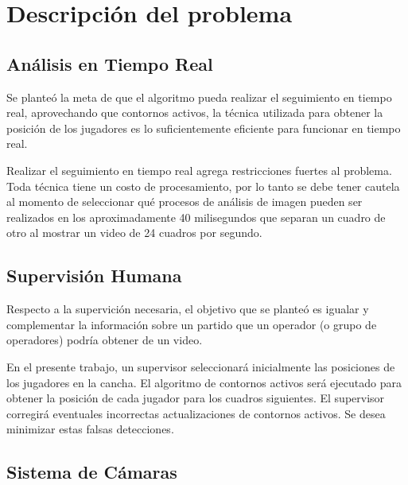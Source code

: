 \chapter{Descripción del problema}
\label{chap-problems}



\section{Análisis en Tiempo Real}

Se planteó la meta de que el algoritmo pueda realizar el seguimiento en tiempo
real, aprovechando que contornos activos, la técnica utilizada para obtener la
posición de los jugadores es lo suficientemente eficiente para funcionar en
tiempo real.

Realizar el seguimiento en tiempo real agrega restricciones fuertes al
problema. Toda técnica tiene un costo de procesamiento, por lo tanto se debe
tener cautela al momento de seleccionar qué procesos de análisis de imagen
pueden ser realizados en los aproximadamente 40 milisegundos que separan un
cuadro de otro al mostrar un video de 24 cuadros por segundo.

\section{Supervisión Humana}

Respecto a la supervición necesaria, el objetivo que se planteó es igualar y
complementar la información sobre un partido que un operador (o grupo de
operadores) podría obtener de un video.

En el presente trabajo, un supervisor seleccionará inicialmente las posiciones
de los jugadores en la cancha. El algoritmo de contornos activos será
ejecutado para obtener la posición de cada jugador para los cuadros siguientes.
El supervisor corregirá eventuales incorrectas actualizaciones de contornos
activos. Se desea minimizar estas falsas detecciones.

\section{Sistema de Cámaras}

